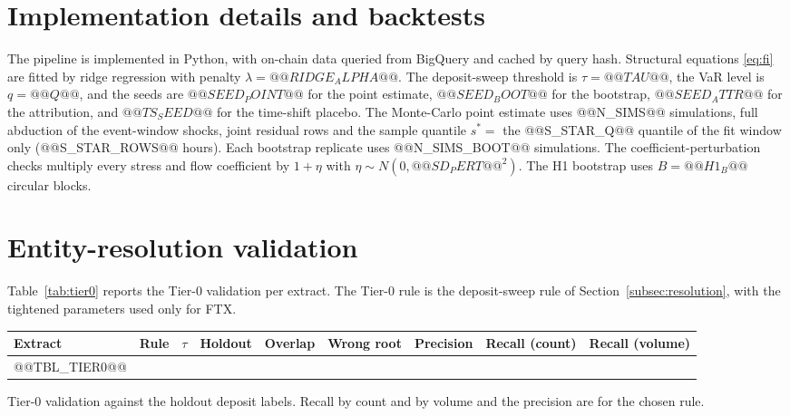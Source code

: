 \documentclass[referee,pdflatex,sn-mathphys-ay]{sn-jnl}
\newcommand{\fitbox}{\ifdim\wd\tabbox>\linewidth\resizebox{\linewidth}{!}{\usebox{\tabbox}}\else\usebox{\tabbox}\fi}%
\theoremstyle{thmstyleone}%
\theoremstyle{thmstyletwo}%
\theoremstyle{thmstylethree}%
\begin{document}
\begin{appendices}

\section{Implementation details and backtests}\label{app:impl}

The pipeline is implemented in Python, with on-chain data queried from BigQuery and cached by query hash. Structural equations
\eqref{eq:fi} are fitted by ridge regression with penalty $\lambda=@@RIDGE_ALPHA@@$. The deposit-sweep threshold is $\tau=@@TAU@@$, the VaR
level is $q=@@Q@@$, and the seeds are $@@SEED_POINT@@$ for the point estimate, $@@SEED_BOOT@@$ for the bootstrap, $@@SEED_ATTR@@$ for the
attribution, and $@@TS_SEED@@$ for the time-shift placebo. The Monte-Carlo point estimate uses @@N_SIMS@@ simulations, full abduction of
the event-window shocks, joint residual rows and the sample quantile $s^\ast=$ the @@S_STAR_Q@@ quantile of the fit window only
(@@S_STAR_ROWS@@ hours). Each bootstrap replicate uses @@N_SIMS_BOOT@@ simulations. The coefficient-perturbation checks multiply
every stress and flow coefficient by $1+\eta$ with $\eta\sim N(0,@@SD_PERT@@^2)$. The H1 bootstrap uses $B=@@H1_B@@$ circular blocks.

\section{Entity-resolution validation}\label{app:resolution}

Table~\ref{tab:tier0} reports the Tier-0 validation per extract. The Tier-0 rule is the deposit-sweep rule of
Section~\ref{subsec:resolution}, with the tightened parameters used only for FTX.

\begin{lrbox}{\tabbox}\footnotesize\setlength{\tabcolsep}{3pt}%
\begin{tabular}{@{}lllcccccc@{}}
\toprule
\textbf{Extract} & \textbf{Rule} & \textbf{$\tau$} & \textbf{Holdout} & \textbf{Overlap} & \textbf{Wrong root} & \textbf{Precision} & \textbf{Recall (count)} & \textbf{Recall (volume)}\\
\midrule
@@TBL_TIER0@@
\bottomrule
\end{tabular}
\end{lrbox}
\begin{tableorg}[tbp]
\centering
\caption{Tier-0 validation against the holdout deposit labels. Recall by count and by volume and the precision are for the chosen rule.}
\label{tab:tier0}
\fitbox
\end{tableorg}


\end{appendices}
\end{document}
